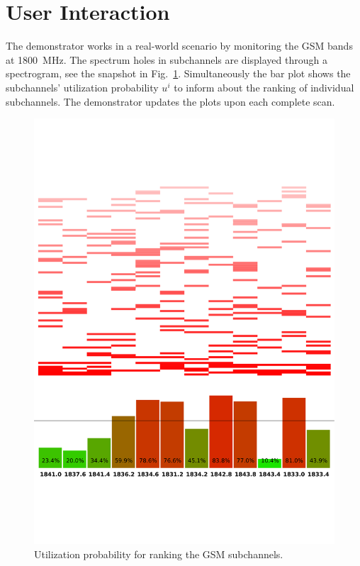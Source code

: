 \documentclass[conference,a4paper]{IEEEtran}
\begin{document}
\section{User Interaction} \label{sec:userint}
The demonstrator works in a real-world scenario by monitoring the GSM bands at
\SI{1800}{MHz}.
The spectrum holes in subchannels are  displayed through a
spectrogram, see the snapshot in Fig.~\ref{fig:uti}.
Simultaneously the bar plot shows the subchannels' utilization probability $u^i$
to inform about the ranking of individual subchannels.
The demonstrator updates the plots upon each complete scan. 
\begin{figure}[!t]
	\centering
	\includegraphics[trim=0.0cm 4.0cm 0.0cm 1.0cm,clip=true,width=\columnwidth]{figures/histo}
	\caption{Utilization probability for ranking the GSM subchannels.}
	\label{fig:uti}
\end{figure}
\end{document}

